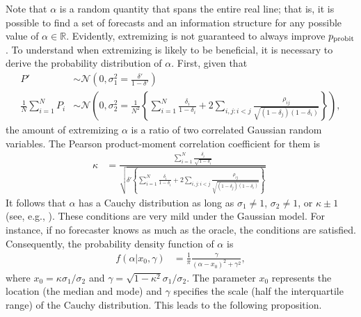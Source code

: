 \documentclass[12pt]{article}
\theoremstyle{definition}
\theoremstyle{definition}
\def\probit{p_{\rm probit}}
\begin{document}
Note that $\alpha$ is a random quantity that spans the entire real line;
that is, it is possible to find a set of forecasts and an information structure for any possible value of $\alpha \in
\mathbb{R}$.  Evidently, extremizing is not guaranteed to always
improve $\probit$.  To understand when extremizing is
likely to be beneficial, it is necessary to derive the probability
distribution of $\alpha$.  First, given that
\begin{align*}
P' &\sim \mathcal{N}\left(0, \sigma^2_{1} = 
  \frac{\delta'}{1-\delta'} \right)\\ \frac{1}{N}\sum_{i=1}^N P_{i} 
&\sim \mathcal{N}\left(0, \sigma^2_{2} =\frac{1}{N^2} 
  \left\{ \sum_{i=1}^N \frac{\delta_i}{1-\delta_i} 
  + 2 \sum_{i,j: i<j} \frac{\rho_{ij}}{\sqrt{(1-\delta_j)(1-\delta_i)}}
  \right\} \right),
\end{align*}
the amount of extremizing $\alpha$ is a ratio of two correlated
Gaussian random variables.  The Pearson product-moment correlation
coefficient for them is
\begin{align*}
\kappa  &= 
  \frac{ \sum_{i=1}^N \frac{\delta_i}{\sqrt{1-\delta_i}}}
  {\sqrt{\delta'  \left\{ \sum_{i=1}^N \frac{\delta_i}{1-\delta_i} + 2 
  \sum_{i,j: i<j} \frac{\rho_{ij}}{\sqrt{(1-\delta_j)(1-\delta_i)}}\right\}}}
  \; 
\end{align*}
It follows that $\alpha$ has a Cauchy distribution as long as
$\sigma_1 \neq 1$, $\sigma_2 \neq 1$, or $\kappa \pm 1$ (see, e.g.,
\citealt{cedilnik2004distribution}).  These
conditions are very mild under the Gaussian model.
For instance, if no forecaster knows as much as the oracle, the
conditions are satisfied.  Consequently, the probability density
function of $\alpha$ is
\begin{align*}
f(\alpha | x_0, \gamma) &= \frac{1}{\pi} 
  \frac{\gamma}{(\alpha-x_0)^2+\gamma^2}, 
\end{align*}
where $x_0 = \kappa \sigma_1/\sigma_2$ and $\gamma = \sqrt{1-\kappa^2}\sigma_1/\sigma_2$. The parameter $x_0$ represents the location (the median and mode) and
$\gamma$ specifies the scale (half the interquartile range) of the
Cauchy distribution. This leads to the following proposition.  
\end{document}
